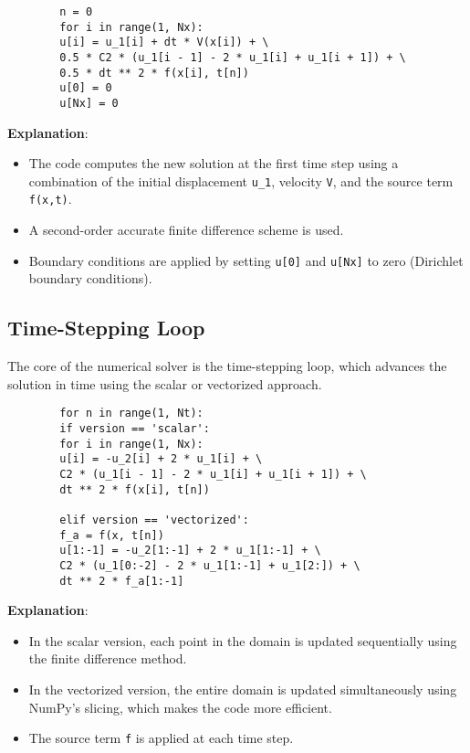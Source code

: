 \documentclass[a4paper, 11pt]{article}
\begin{document}
	\lstset{language=Python}
	\begin{lstlisting}
		n = 0
		for i in range(1, Nx):
		u[i] = u_1[i] + dt * V(x[i]) + \
		0.5 * C2 * (u_1[i - 1] - 2 * u_1[i] + u_1[i + 1]) + \
		0.5 * dt ** 2 * f(x[i], t[n])
		u[0] = 0
		u[Nx] = 0
	\end{lstlisting}
	
	\textbf{Explanation}:
	\begin{itemize}
		\item The code computes the new solution at the first time step using a combination of the initial displacement \texttt{u\_1}, velocity \texttt{V}, and the source term \texttt{f(x,t)}.
		\item A second-order accurate finite difference scheme is used.
		\item Boundary conditions are applied by setting \texttt{u[0]} and \texttt{u[Nx]} to zero (Dirichlet boundary conditions).
	\end{itemize}
	
	\subsection{Time-Stepping Loop}
	
	The core of the numerical solver is the time-stepping loop, which advances the solution in time using the scalar or vectorized approach.
	
	\lstset{language=Python}
	\begin{lstlisting}
		for n in range(1, Nt):
		if version == 'scalar':
		for i in range(1, Nx):
		u[i] = -u_2[i] + 2 * u_1[i] + \
		C2 * (u_1[i - 1] - 2 * u_1[i] + u_1[i + 1]) + \
		dt ** 2 * f(x[i], t[n])
		
		elif version == 'vectorized':
		f_a = f(x, t[n])
		u[1:-1] = -u_2[1:-1] + 2 * u_1[1:-1] + \
		C2 * (u_1[0:-2] - 2 * u_1[1:-1] + u_1[2:]) + \
		dt ** 2 * f_a[1:-1]
	\end{lstlisting}
	
	\textbf{Explanation}:
	\begin{itemize}
		\item In the scalar version, each point in the domain is updated sequentially using the finite difference method.
		\item In the vectorized version, the entire domain is updated simultaneously using NumPy’s slicing, which makes the code more efficient.
		\item The source term \texttt{f} is applied at each time step.
	\end{itemize}
	
\end{document}
